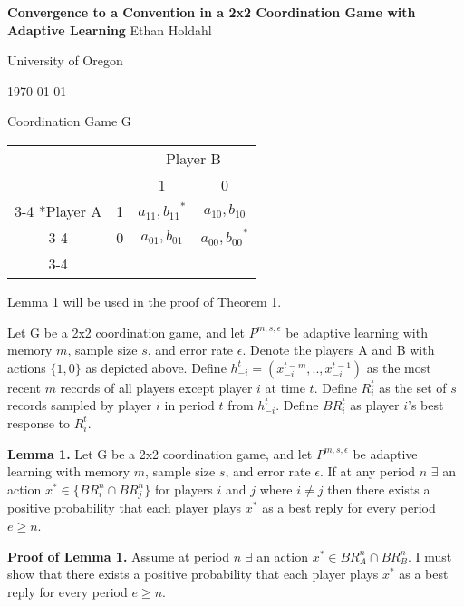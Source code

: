 \documentclass{article}
\begin{document}
\centering
\Large
\textbf{Convergence to a Convention in a 2x2 Coordination Game with Adaptive Learning}
\vskip0pt
Ethan Holdahl

\large
University of Oregon

\today

\vskip24pt

\centering
Coordination Game G
\vskip6pt
    \begin{tabular}{cc|c|c|}
      & \multicolumn{1}{c}{} & \multicolumn{2}{c}{Player B}\\
      & \multicolumn{1}{c}{} & \multicolumn{1}{c}{1}  & \multicolumn{1}{c}{0} \\\cline{3-4}
      \multirow{2}*{Player A}  & 1 & ${a_{11},b_{11}}^*$ & $a_{10},b_{10}$ \\\cline{3-4}
      & 0 & $a_{01},b_{01}$ & ${a_{00},b_{00}}^*$ \\\cline{3-4}
    \end{tabular}

\vskip24pt

\raggedright

Lemma 1 will be used in the proof of Theorem 1.

\vskip12pt
Let G be a 2x2 coordination game, and let $P^{m,s,\epsilon}$ be adaptive learning with memory $m$, sample size $s$, and error rate $\epsilon$.
Denote the players A and B with actions $\{1,0\}$ as depicted above. Define $h_{-i}^{t}=(x_{-i}^{t-m},..,x_{-i}^{t-1})$ as the most recent $m$ records of all players except player $i$ at time $t$. Define $R_i^{t}$ as the set of $s$ records sampled by player $i$ in period $t$ from $h_{-i}^{t}$. Define $BR_i^{t}$ as player $i$'s best response to $R_i^{t}$.

\vskip12pt

\textbf{Lemma 1.} Let G be a 2x2 coordination game, and let $P^{m,s,\epsilon}$ be adaptive learning with memory $m$, sample size $s$, and error rate $\epsilon$. If at any period $n$ $\exists$ an action $ x^* \in \{BR_i^{n} \cap BR_j^{n}\}$ for players $i$ and $j$ where $i \neq j$ then there exists a positive probability that each player plays $x^*$ as a best reply for every period $e \geq n$.

\vskip12pt

\textbf{Proof of Lemma 1.} Assume at period $n$ $\exists$ an action $ x^* \in BR_A^{n} \cap BR_B^{n}$. I must show that there exists a positive probability that each player plays $x^*$ as a best reply for every period $e \geq n$.

\vskip12pt
\end{document}
